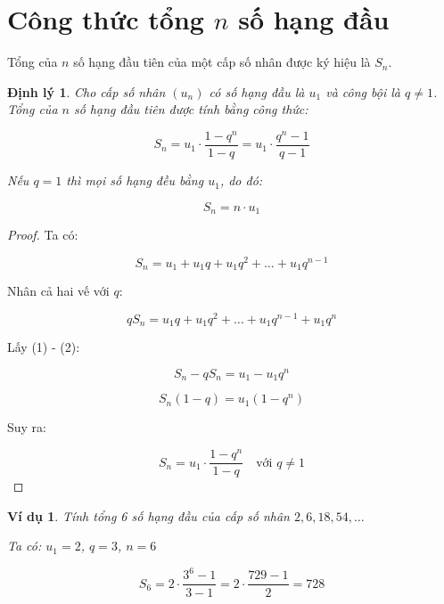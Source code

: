 \documentclass[12pt,a4paper]{report}
\newtheorem{theorem}{Định lý}[section]
\newtheorem{example}{Ví dụ}[section]
\begin{document}

\section{Công thức tổng \texorpdfstring{$n$}{n} số hạng đầu}

Tổng của $n$ số hạng đầu tiên của một cấp số nhân được ký hiệu là $S_n$.

\begin{theorem}
    Cho cấp số nhân $(u_n)$ có số hạng đầu là $u_1$ và công bội là $q \neq 1$. Tổng của $n$ số hạng đầu tiên được tính bằng công thức:
    
    \[
        S_n = u_1 \cdot \frac{1 - q^n}{1 - q}
        = u_1 \cdot \frac{q^n - 1}{q - 1}
    \]
    
    Nếu $q = 1$ thì mọi số hạng đều bằng $u_1$, do đó:
    
    \[
        S_n = n \cdot u_1
    \]
\end{theorem}

\begin{proof}
    Ta có:
    
    \[
        S_n = u_1 + u_1q + u_1q^2
        + \dots + u_1q^{n-1}
        \tag{1}
    \]
    
    Nhân cả hai vế với $q$:
    
    \[
        qS_n = u_1q + u_1q^2 + \dots
        + u_1q^{n-1} + u_1q^n
        \tag{2}
    \]
    
    Lấy (1) - (2):
    
    \[
        S_n - qS_n = u_1 - u_1q^n
    \]
    
    \[
        S_n(1 - q) = u_1(1 - q^n)
    \]
    
    Suy ra:
    
    \[
        S_n = u_1 \cdot \frac{1 - q^n}{1 - q}
        \quad \text{với } q \neq 1
    \]
\end{proof}

\begin{example}
    Tính tổng 6 số hạng đầu của cấp số nhân $2, 6, 18, 54, \dots$
    
    Ta có: $u_1 = 2$, $q = 3$, $n = 6$
    
    \[
        S_6
        = 2 \cdot \frac{3^6 - 1}{3 - 1}
        = 2 \cdot \frac{729 - 1}{2}
        = 728
    \]
\end{example}
\end{document}
